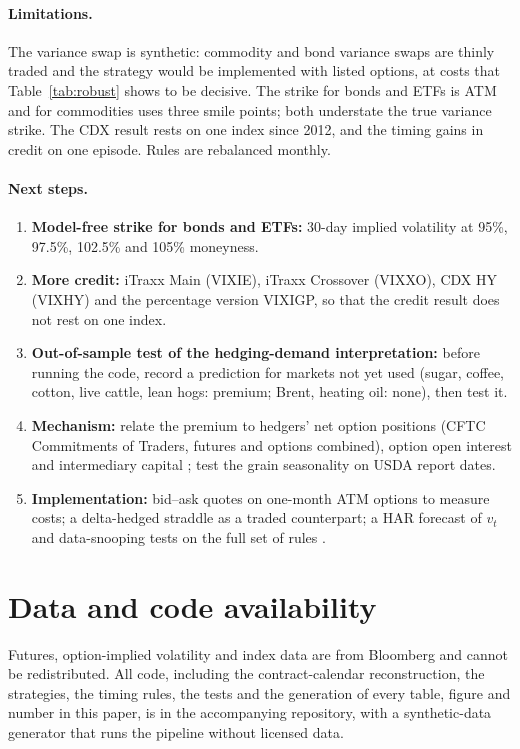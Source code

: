 \documentclass[11pt,a4paper]{article}
\theoremstyle{remark}
\begin{document}
\paragraph{Limitations.} The variance swap is synthetic: commodity and bond variance swaps are thinly traded and the strategy would be implemented with listed options, at costs that Table~\ref{tab:robust} shows to be decisive. The strike for bonds and ETFs is ATM and for commodities uses three smile points; both understate the true variance strike. The CDX result rests on one index since 2012, and the timing gains in credit on one episode. Rules are rebalanced monthly.

\paragraph{Next steps.}
\begin{enumerate}
\item \textbf{Model-free strike for bonds and ETFs:} 30-day implied volatility at 95\%, 97.5\%, 102.5\% and 105\% moneyness.
\item \textbf{More credit:} iTraxx Main (VIXIE), iTraxx Crossover (VIXXO), CDX HY (VIXHY) and the percentage version VIXIGP, so that the credit result does not rest on one index.
\item \textbf{Out-of-sample test of the hedging-demand interpretation:} before running the code, record a prediction for markets not yet used (sugar, coffee, cotton, live cattle, lean hogs: premium; Brent, heating oil: none), then test it.
\item \textbf{Mechanism:} relate the premium to hedgers' net option positions (CFTC Commitments of Traders, futures and options combined), option open interest and intermediary capital \citep{hekellymanela2017}; test the grain seasonality on USDA report dates.
\item \textbf{Implementation:} bid--ask quotes on one-month ATM options to measure costs; a delta-hedged straddle as a traded counterpart; a HAR forecast of $v_t$ and data-snooping tests on the full set of rules \citep{white2000,hansen2005,romanowolf2005}.
\end{enumerate}

\section*{Data and code availability}

Futures, option-implied volatility and index data are from Bloomberg and cannot be redistributed. All code, including the contract-calendar reconstruction, the strategies, the timing rules, the tests and the generation of every table, figure and number in this paper, is in the accompanying repository, with a synthetic-data generator that runs the pipeline without licensed data.
\end{document}
